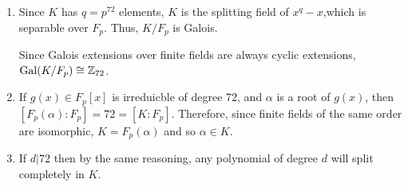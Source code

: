 \documentclass[12pt]{Qual}
\begin{document}
\begin{solution}$\,$
\begin{enumerate}[label=(\alph*)]
    \item Since $K$ has $q=p^{72}$ elements, $K$ is the splitting field of $x^q-x$,which is separable over $F_p$. Thus, $K/F_p$ is Galois.

    Since Galois extensions over finite fields are always cyclic extensions, $\text{Gal}(K/F_p)\cong\mathbb{Z}_{72}$.

    \item If $g(x)\in F_p[x]$ is irreduicble of degree $72$, and $\alpha$ is a root of $g(x)$, then $[F_p(\alpha):F_p]=72=[K:F_p]$. Therefore, since finite fields of the same order are isomorphic, $K=F_p(\alpha)$ and so $\alpha\in K.$

    \item If $d|72$ then by the same reasoning, any polynomial of degree $d$ will split completely in $K$.
\end{enumerate}
\end{solution}
\newpage
\end{document}

